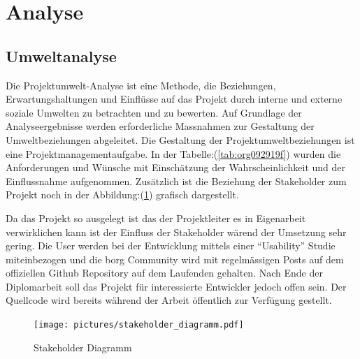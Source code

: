 \section{Analyse}
\label{sec:orgd2e8df3}
\subsection{Umweltanalyse}
\label{sec:org65077db}

Die Projektumwelt-Analyse ist eine Methode, die Beziehungen,
Erwartungshaltungen und Einflüsse auf das Projekt durch interne und
externe soziale Umwelten zu betrachten und zu bewerten. Auf Grundlage
der Analyseergebnisse werden erforderliche Massnahmen zur Gestaltung
der Umweltbeziehungen abgeleitet. Die Gestaltung der
Projektumweltbeziehungen ist eine Projektmanagementaufgabe. In der
Tabelle:(\ref{tab:org092919f}) wurden die Anforderungen und Wünsche
mit Einschätzung der Wahrscheinlichkeit und der Einflussnahme aufgenommen.
Zusätzlich ist die Beziehung der Stakeholder zum Projekt noch in der
Abbildung:(\ref{fig:org1ce1a4e}) grafisch dargestellt.

Da das Projekt so ausgelegt ist das der Projektleiter es in Eigenarbeit
verwirklichen kann ist der Einfluss der Stakeholder wärend der Umsetzung sehr
gering. Die User werden bei der Entwicklung mittels einer "`Usability"' Studie
miteinbezogen und die \gls{borg} Community wird mit regelmässigen Posts auf dem
offiziellen Github Repository auf dem Laufenden gehalten.
Nach Ende der Diplomarbeit soll das Projekt für interessierte Entwickler jedoch
offen sein. Der Quellcode wird bereits während der Arbeit öffentlich zur
Verfügung gestellt.

\begin{figure}[htbp]
\centering
\texttt{[image: pictures/stakeholder\_diagramm.pdf]}
\caption{\label{fig:org1ce1a4e}
Stakeholder Diagramm}
\end{figure}


